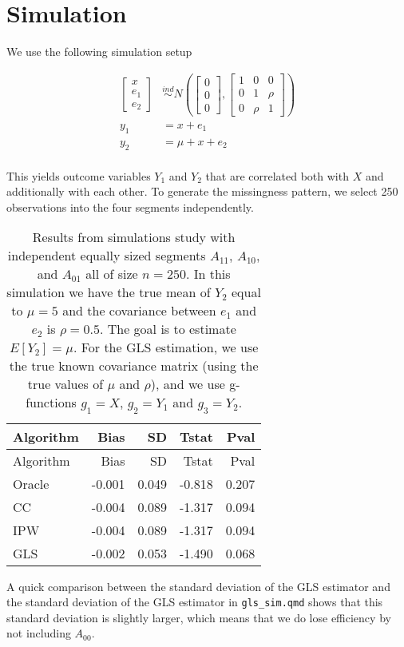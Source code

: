 \documentclass[
  letterpaper,
  DIV=11,
  numbers=noendperiod]{scrartcl}
\begin{document}
\newpage{}

\section{Simulation}\label{simulation}

We use the following simulation setup

\begin{align*}
  \begin{bmatrix} x \\ e_1 \\ e_2 \end{bmatrix} 
  &\stackrel{ind}{\sim} N\left(\begin{bmatrix} 0 \\ 0 \\ 0 \end{bmatrix}, 
  \begin{bmatrix} 1 & 0 & 0 \\ 0 & 1 & \rho \\ 0 & \rho & 1 \end{bmatrix}\right) \\
  y_1 &= x + e_1 \\
  y_2 &= \mu + x + e_2 \\
\end{align*}

This yields outcome variables \(Y_1\) and \(Y_2\) that are correlated
both with \(X\) and additionally with each other. To generate the
missingness pattern, we select 250 observations into the four segments
independently.

\begin{longtable}[]{@{}lrrrr@{}}
\caption{Results from simulations study with independent equally sized
segments \(A_{11}\), \(A_{10}\), and \(A_{01}\) all of size \(n = 250\).
In this simulation we have the true mean of \(Y_2\) equal to \(\mu = 5\)
and the covariance between \(e_1\) and \(e_2\) is \(\rho = 0.5\). The
goal is to estimate \(E[Y_2] = \mu\). For the GLS estimation, we use the
true known covariance matrix (using the true values of \(\mu\) and
\(\rho\)), and we use g-functions \(g_1 = X\), \(g_2 = Y_1\) and
\(g_3 = Y_2\).}\tabularnewline
\toprule\noalign{}
Algorithm & Bias & SD & Tstat & Pval \\
\midrule\noalign{}
\endfirsthead
\toprule\noalign{}
Algorithm & Bias & SD & Tstat & Pval \\
\midrule\noalign{}
\endhead
\bottomrule\noalign{}
\endlastfoot
Oracle & -0.001 & 0.049 & -0.818 & 0.207 \\
CC & -0.004 & 0.089 & -1.317 & 0.094 \\
IPW & -0.004 & 0.089 & -1.317 & 0.094 \\
GLS & -0.002 & 0.053 & -1.490 & 0.068 \\
\end{longtable}

A quick comparison between the standard deviation of the GLS estimator
and the standard deviation of the GLS estimator in \texttt{gls\_sim.qmd}
shows that this standard deviation is slightly larger, which means that
we do lose efficiency by not including \(A_{00}\).
\end{document}
